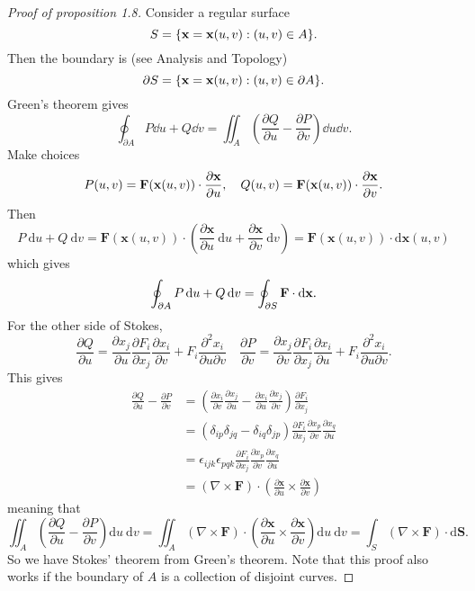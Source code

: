 \begin{proof}[Proof of proposition 1.8]
    Consider a regular surface 
    \[
        S = \{{\bf x}={\bf x}(u,v): (u,v)\in A\}.
    \]
    Then the boundary is (see Analysis and Topology)
    \[
        \partial S = \{{\bf x}={\bf x}(u,v): (u,v)\in \partial A\}.
    \]
    Green's theorem gives 
    \[
        \oint_{\partial A} P\dd u+Q\dd v = \iint_{A} \left( \frac{\partial Q}{\partial u}-\frac{\partial P}{\partial v}   \right)\dd u\dd v.
    \]
    Make choices 
    \[
        P(u,v) = {\bf F}({\bf x}(u,v)) \cdot \frac{\partial {\bf x}}{\partial u},\quad Q(u,v) = {\bf F}({\bf x}(u,v)) \cdot \frac{\partial {\bf x}}{\partial v}.  
    \]
    Then 
    \[
        P \mathrm{~d} u+Q \mathrm{~d} v=\mathbf{F}(\mathbf{x}(u, v)) \cdot\left(\frac{\partial \mathbf{x}}{\partial u} \mathrm{~d} u+\frac{\partial \mathbf{x}}{\partial v} \mathrm{~d} v\right)=\mathbf{F}(\mathbf{x}(u, v)) \cdot \mathrm{d} \mathbf{x}(u, v)
    \]
    which gives 
    \[
        \oint_{\partial A} P\,\mathrm{d} u+Q\,\mathrm{d} v = \oint_{\partial S} {\bf F} \cdot \mathrm{d}{\bf x}.
    \]
    For the other side of Stokes, 
    \[
        \frac{\partial Q}{\partial u}=\frac{\partial x_{j}}{\partial u} \frac{\partial F_{i}}{\partial x_{j}} \frac{\partial x_{i}}{\partial v}+F_{i} \frac{\partial^{2} x_{i}}{\partial u \partial v}\quad \frac{\partial P}{\partial v}=\frac{\partial x_{j}}{\partial v} \frac{\partial F_{i}}{\partial x_{j}} \frac{\partial x_{i}}{\partial u}+F_{i} \frac{\partial^{2} x_{i}}{\partial u \partial v}.
    \]
    This gives
    \begin{align*}
        \frac{\partial Q}{\partial u}-\frac{\partial P}{\partial v} &=\left(\frac{\partial x_{i}}{\partial v} \frac{\partial x_{j}}{\partial u}-\frac{\partial x_{i}}{\partial u} \frac{\partial x_{j}}{\partial v}\right) \frac{\partial F_{i}}{\partial x_{j}} \\
        &=\left(\delta_{i p} \delta_{j q}-\delta_{i q} \delta_{j p}\right) \frac{\partial F_{i}}{\partial x_{j}} \frac{\partial x_{p}}{\partial v} \frac{\partial x_{q}}{\partial u} \\
        &=\epsilon_{i j k} \epsilon_{p q k} \frac{\partial F_{i}}{\partial x_{j}} \frac{\partial x_{p}}{\partial v} \frac{\partial x_{q}}{\partial u} \\
        &=(\nabla \times \mathbf{F}) \cdot\left(\frac{\partial \mathbf{x}}{\partial u} \times \frac{\partial \mathbf{x}}{\partial v}\right)
    \end{align*}
    meaning that
    \[
        \iint_{A}\left(\frac{\partial Q}{\partial u}-\frac{\partial P}{\partial v}\right) \mathrm{d} u \mathrm{~d} v=\iint_{A}(\nabla \times \mathbf{F}) \cdot\left(\frac{\partial \mathbf{x}}{\partial u} \times \frac{\partial \mathbf{x}}{\partial v}\right) \mathrm{d} u \mathrm{~d} v=\int_{S}(\nabla \times \mathbf{F}) \cdot \mathrm{d} \mathbf{S} .
    \]
    So we have Stokes' theorem from Green's theorem. Note that this proof also works if the boundary of $A$ is a collection of disjoint curves.
\end{proof}